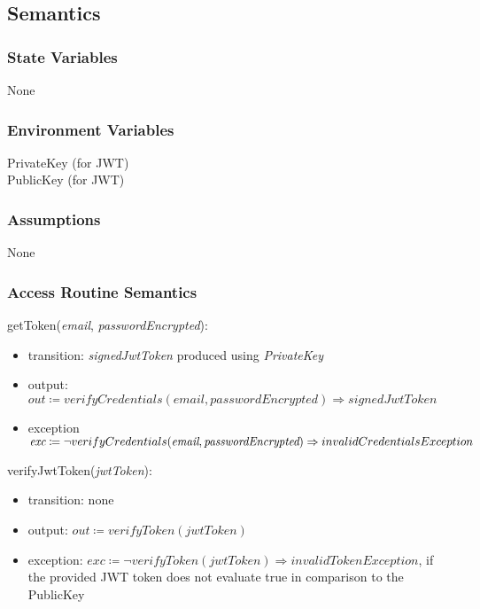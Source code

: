 \documentclass[12pt, titlepage]{article}
\begin{document}
\subsection{Semantics}

\subsubsection{State Variables}
None

\subsubsection{Environment Variables}
PrivateKey (for JWT) \\
PublicKey (for JWT)

\subsubsection{Assumptions}
None

\subsubsection{Access Routine Semantics}

\noindent getToken(\textit{email}, \textit{passwordEncrypted}):
\begin{itemize}
\item transition: \textit{signedJwtToken} produced using \textit{PrivateKey}
\item output: \( \textit{out} \coloneqq verifyCredentials(\textit{email}, \textit{passwordEncrypted}) \Rightarrow  signedJwtToken\) \\
\item exception \( \textit{exc} \coloneqq \neg verifyCredentials(\textit{email}, \textit{passwordEncrypted}) \Rightarrow \\ invalidCredentialsException\)
\end{itemize}

\noindent verifyJwtToken(\textit{jwtToken}):
\begin{itemize}
\item transition: none
\item output: \( \textit{out} \coloneqq verifyToken(\textit{jwtToken})\)
\item exception: \( \textit{exc} \coloneqq \neg verifyToken(\textit{jwtToken}) \Rightarrow invalidTokenException \), if the provided JWT token does not evaluate true in comparison to the PublicKey
\end{itemize}
\end{document}
